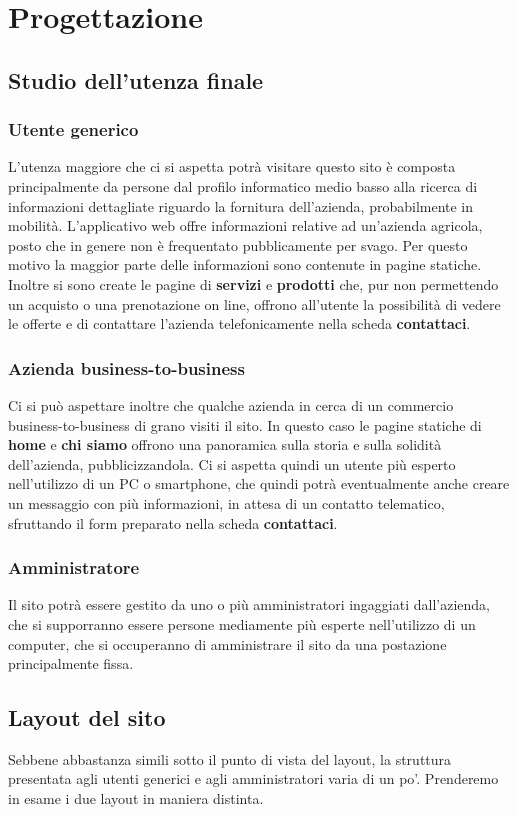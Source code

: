 \newpage
\section{Progettazione}
\subsection{Studio dell'utenza finale}
\subsubsection{Utente generico}
L'utenza maggiore che ci si aspetta potrà visitare questo sito è composta principalmente da persone dal profilo informatico medio basso alla ricerca di informazioni dettagliate riguardo la fornitura dell'azienda, probabilmente in mobilità. L'applicativo web offre informazioni relative ad un'azienda agricola, posto che in genere non è frequentato pubblicamente per svago. Per questo motivo la maggior parte delle informazioni sono contenute in pagine statiche. Inoltre si sono create le pagine di \textbf{servizi} e \textbf{prodotti} che, pur non permettendo un acquisto o una prenotazione on line, offrono all'utente la possibilità di vedere le offerte e di contattare l'azienda telefonicamente nella scheda \textbf{contattaci}.
\subsubsection{Azienda business-to-business}
Ci si può aspettare inoltre che qualche azienda in cerca di un commercio business-to-business di grano visiti il sito. In questo caso le pagine statiche di \textbf{home} e \textbf{chi siamo} offrono una panoramica sulla storia e sulla solidità dell'azienda, pubblicizzandola. Ci si aspetta quindi un utente più esperto nell'utilizzo di un PC o smartphone, che quindi potrà eventualmente anche creare un messaggio con più informazioni, in attesa di un contatto telematico, sfruttando il form preparato nella scheda \textbf{contattaci}.
\subsubsection{Amministratore}
Il sito potrà essere gestito da uno o più amministratori ingaggiati dall'azienda, che si supporranno essere persone mediamente più esperte nell'utilizzo di un computer, che si occuperanno di amministrare il sito da una postazione principalmente fissa.

\subsection{Layout del sito}
Sebbene abbastanza simili sotto il punto di vista del layout, la struttura presentata agli utenti generici e agli amministratori varia di un po'. Prenderemo in esame i due layout in maniera distinta.
